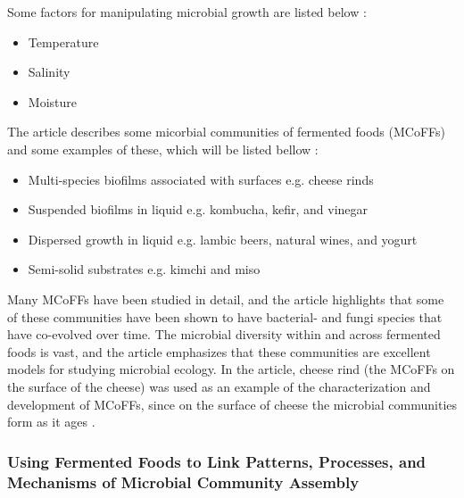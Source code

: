Some factors for manipulating microbial growth are listed below \cite*{L1-FermentedFoods}:
\begin{highlight}
    \begin{itemize}
    \item Temperature
    \item Salinity
    \item Moisture
    \end{itemize}
\end{highlight}

\vspace*{1em}
The article describes some micorbial communities of fermented foods (MCoFFs) and some examples of these, which will be listed bellow \cite*{L1-FermentedFoods}:
\begin{highlight}
    \begin{itemize}
    \item Multi-species biofilms associated with surfaces 
    \subitem e.g. cheese rinds
    \vspace*{0.5em}

    \item Suspended biofilms in liquid
    \subitem e.g. kombucha, kefir, and vinegar
    \vspace*{0.5em}

    \item Dispersed growth in liquid
    \subitem e.g. lambic beers, natural wines, and yogurt
    \vspace*{0.5em}

    \item Semi-solid substrates
    \subitem e.g. kimchi and miso
    \end{itemize}
\end{highlight}

Many MCoFFs have been studied in detail, and the article highlights that some of these communities have been shown to have bacterial- and fungi species that have co-evolved over time. The microbial diversity within and across fermented foods is vast, and the article emphasizes that these communities are excellent models for studying microbial ecology. In the article, cheese rind (the MCoFFs on the surface of the cheese) was used as an example of the characterization and development of MCoFFs, since on the surface of cheese the microbial communities form as it ages \cite*{L1-FermentedFoods}.

\subsubsection*{Using Fermented Foods to Link Patterns, Processes, and Mechanisms of Microbial Community Assembly}

